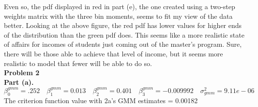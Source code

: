 \documentclass[letterpaper,12pt]{article}
\theoremstyle{definition}
\begin{document}
Even so, the pdf displayed in red in part (e), the one created using a two-step
weights matrix with the three bin moments, seems to fit my view of the data better. Looking at the above figure, the red pdf has lower values for higher ends of the distribution than the green pdf does. This seems like a more realistic state of affairs for incomes of students just coming out of the master's program. Sure, there will be those able to achieve that level of income, but it seems more realistic to model that fewer will be able to do so.
\\
\noindent\textbf{Problem 2}
\\
\noindent\textbf{Part (a).}
\\
$\beta^{gmm}_{0} = .252\quad \beta^{gmm}_{1} = 0.013\quad\beta^{gmm}_{2} = 0.401\quad \beta^{gmm}_{3} = -0.009992\quad\sigma^{2}_{gmm}=9.11e-06$
The  criterion function value with 2a's GMM estimates = 0.00182
\end{document}
